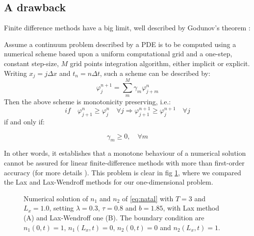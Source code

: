\subsection{A drawback}

Finite difference methods have a big limit, well described by Godunov's
theorem \cite{Godunov54,Godunov59}:
\begin{thm}
Assume a continuum problem described by a PDE is to be computed using
a numerical scheme based upon a uniform computational grid and a one-step,
constant step-size, $M$ grid points integration algorithm, either
implicit or explicit. Writing $x_{j}=j\Delta x$ and $t_{n}=n\Delta t$,
such a scheme can be described by:
\[
\varphi_{j}^{n+1}=\sum\limits _{m}^{M}{\gamma_{m}\varphi_{j+m}^{n}}
\]
Then the above scheme is monotonicity preserving, i.e.:
\[
if\quad\varphi_{j+1}^{n}\geq\varphi_{j}^{n}\quad\forall j\Rightarrow\varphi_{j+1}^{n+1}\geq\varphi_{j}^{n+1}\quad\forall j
\]
 if and only if: 

\[
\gamma_{m}\ge0,\quad\forall m
\]
\end{thm}

In other words, it establishes that a monotone behaviour of a numerical
solution cannot be assured for linear finite-difference methods with
more than first-order accuracy (for more details \cite{tryggvason_lecture_2017,thirumgam_numerical_2012}).
This problem is clear in fig \ref{fig:oscill_example}, where we compared
the Lax and Lax-Wendroff methods for our one-dimensional problem.

\begin{figure}


\caption{\label{fig:oscill_example}Numerical solution of $n_{1}$ and $n_{2}$
of \ref{eq:natal} with $T=3$ and $L_{x}=1.0$, setting $\lambda=0.3$,
$\tau=0.8$ and $b=1.85$, with Lax method (A) and Lax-Wendroff one
(B). The boundary condition are $n_{1}(0,t)=1$, $n_{1}(L_{x},t)=0$,
$n_{2}(0,t)=0$ and $n_{2}(L_{x},t)=1$.}

\end{figure}


